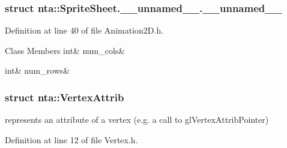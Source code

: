 \subsubsection{struct nta\+:\+:Sprite\+Sheet.\+\_\+\+\_\+unnamed\+\_\+\+\_\+.\+\_\+\+\_\+unnamed\+\_\+\+\_\+}


Definition at line 40 of file Animation2\+D.\+h.

\begin{DoxyFields}{Class Members}
\mbox{\label{namespacenta_a2ec7686cdf35752083c4cb22b93e362e}} 
int&
num\_cols&
\\
\hline

\mbox{\label{namespacenta_ab428d91d44d86e0b79d1a3193951b762}} 
int&
num\_rows&
\\
\hline

\end{DoxyFields}
\label{structnta_1_1VertexAttrib}
\subsubsection{struct nta\+:\+:Vertex\+Attrib}
represents an attribute of a vertex (e.\+g. a call to gl\+Vertex\+Attrib\+Pointer) 

Definition at line 12 of file Vertex.\+h.




